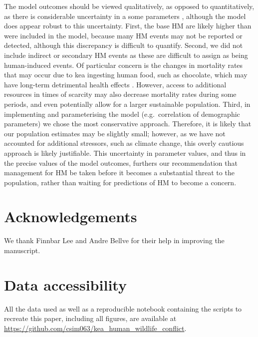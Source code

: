 \documentclass[11pt,]{article}
\begin{document}
The model outcomes should be viewed qualitatively, as opposed to
quantitatively, as there is considerable uncertainty in a some
parameters \citep{coulson2001}, although the model does appear robust to
this uncertainty. First, the base HM are likely higher than were
included in the model, because many HM events may not be reported or
detected, although this discrepancy is difficult to quantify. Second, we
did not include indirect or secondary HM events as these are difficult
to assign as being human-induced events. Of particular concern is the
changes in mortality rates that may occur due to kea ingesting human
food, such as chocolate, which may have long-term detrimental health
effects \citep{gartrell2007}. However, access to additional resources in
times of scarcity may also decrease mortality rates during some periods,
and even potentially allow for a larger sustainable population. Third,
in implementing and parameterising the model (e.g.~correlation of
demographic parameters) we chose the most conservative approach.
Therefore, it is likely that our population estimates may be slightly
small; however, as we have not accounted for additional stressors, such
as climate change, this overly cautious approach is likely justifiable.
This uncertainty in parameter values, and thus in the precise values of
the model outcomes, furthers our recommendation that management for HM
be taken before it becomes a substantial threat to the population,
rather than waiting for predictions of HM to become a concern.

\hypertarget{acknowledgements}{%
\section{Acknowledgements}\label{acknowledgements}}

We thank Finnbar Lee and Andre Bellve for their help in improving the
manuscript.

\hypertarget{data-accessibility}{%
\section{Data accessibility}\label{data-accessibility}}

All the data used as well as a reproducible notebook containing the
scripts to recreate this paper, including all figures, are available at
\url{https://github.com/csim063/kea_human_wildlife_conflict}.

\newpage
\singlespacing 
\renewcommand\refname{References}

\end{document}
